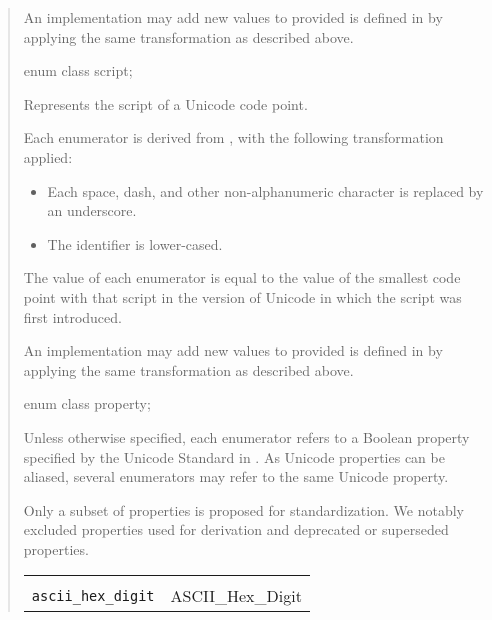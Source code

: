 \documentclass{wg21}
\begin{document}
\begin{quote}
\begin{itemdescr}
\begin{note}
An implementation may add new values to  provided is defined in \cite{PropertyValueAliases} by applying the same transformation as described above.
\end{note}

\end{itemdescr}


\begin{itemdecl}
enum class script;
\end{itemdecl}

\begin{itemdescr}

Represents the script of a Unicode code point.

Each enumerator is derived from \cite{PropertyValueAliases}, with the following transformation applied:
\begin{itemize}
    \item Each space, dash, and other non-alphanumeric character is replaced by an underscore.
    \item The identifier is lower-cased.
\end{itemize}

The value of each enumerator is equal to the value of the smallest code point with that script in the version of Unicode in which the script was first introduced.

\begin{note}
    An implementation may add new values to  provided is defined in \cite{PropertyValueAliases} by applying the same transformation as described above.
\end{note}

\end{itemdescr}


\begin{itemdecl}
enum class property;
\end{itemdecl}


\begin{itemdescr}

Unless otherwise specified, each enumerator refers to a Boolean property specified by the Unicode Standard in \cite{UCD}.
As Unicode properties can be aliased, several enumerators may refer to the same Unicode property.

Only a subset of properties is proposed for standardization. We notably excluded properties used for derivation and deprecated or superseded properties.

\begin{longtable}{| l | l | }
\hline
\makecell[l]{\lstinline{ahex} \\ \lstinline{ascii_hex_digit}}
&
ASCII_Hex_Digit \\
\hline


\end{longtable}
\end{itemdescr}
\end{quote}
\end{document}
